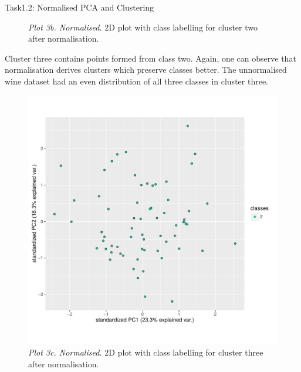 \documentclass[11pt]{article}
\begin{document}
\begin{subsection}{Task1.2: Normalised PCA and Clustering}
\begin{figure}[H]
    \caption{\textit{Plot 3b. Normalised.} 2D plot with class labelling for cluster two after normalisation.}
    \label{fig:p3b_n}
\end{figure}
\pagebreak Cluster three contains points formed from class two. Again, one can observe that normalisation derives clusters which preserve classes better. The unnormalised wine dataset had an even distribution of all three classes in cluster three.
\begin{figure}[H]
    \centering
    \includegraphics[width=1.0\textwidth]{p3c_n}
    \caption{\textit{Plot 3c. Normalised.} 2D plot with class labelling for cluster three after normalisation.}
    \label{fig:p3c_n}
\end{figure}
\end{subsection}
\end{document}
